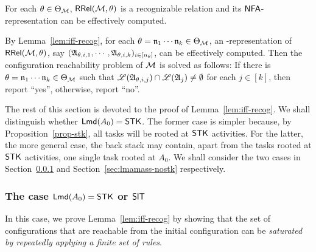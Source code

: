 \begin{lemma}\label{lem:iff-recog}
    For each $\theta \in \Theta_{\mathcal{M} }$, $\mathsf{RRel}({\mathcal{M} }, \theta)$ is a recognizable relation and its $\textsf{NFA}$-representation can be effectively computed.
\end{lemma} 

By Lemma~\ref{lem:iff-recog}, for each $\theta = \mathfrak{n}_1 \cdots \mathfrak{n}_k \in \Theta_{\mathcal{M} }$, an {\NFA}-representation of $\mathsf{RRel}({\mathcal{M} }, \theta)$, say $({\mathfrak{A} }_{\theta, i,1},\cdots,{\mathfrak{A} }_{\theta, i,k})_{i \in [n_\theta]}$, can be effectively computed. 
Then the configuration reachability problem of ${\mathcal{M} }$ is solved as follows: If there is $\theta =  \mathfrak{n}_1 \cdots \mathfrak{n}_k \in \Theta_{\mathcal{M} }$ such that ${\mathscr{L} }({\mathfrak{A} }_{\theta, i, j}) \cap {\mathscr{L} }({\mathfrak{A} }_j) \neq \emptyset$ for each $j \in [k]$, then report ``yes'', otherwise, report ``no''.

The rest of this section is devoted to the proof of Lemma~\ref{lem:iff-recog}. We shall distinguish whether ${\sf Lmd}(A_0) = \mathsf{STK}$. 
The former case is simpler because, by Proposition~\ref{prop-stk}, all tasks will be rooted at $\mathsf{STK}$ activities. For the latter, the more general case, the back stack may contain, apart from the tasks rooted at $\mathsf{STK}$ activities, one single task rooted at $A_0$. 
We shall consider the two cases in Section~\ref{sec:lmamass-stk} and Section~\ref{sec:lmamass-nostk} respectively.



\subsubsection{The case ${\sf Lmd}(A_0) = \mathsf{STK}$ or $\mathsf{SIT}$}\label{sec:lmamass-stk}

In this case, we prove Lemma~\ref{lem:iff-recog} by showing that the set of configurations that are reachable from the initial configuration can be \emph{saturated by repeatedly applying a finite set of rules}. 

